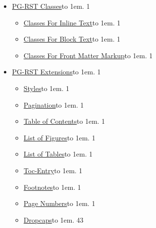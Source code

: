 \documentclass[a5paper]{book}
\begin{document}
\begin{german}
\begin{contents_env}
\begin{itemize}
\begin{itemize}
\item[] \hyperlink{debian}{Debian}\leaders\hbox to 1em{\hss.\hss}\hfill{} 1
\end{itemize}

\item[] \hyperlink{pg-rst-classes}{PG-RST Classes}\leaders\hbox to 1em{\hss.\hss}\hfill{} 1
\begin{itemize}
\item[] \hyperlink{classes-for-inline-text}{Classes For Inline Text}\leaders\hbox to 1em{\hss.\hss}\hfill{} 1

\item[] \hyperlink{classes-for-block-text}{Classes For Block Text}\leaders\hbox to 1em{\hss.\hss}\hfill{} 1

\item[] \hyperlink{classes-for-front-matter-markup}{Classes For Front Matter Markup}\leaders\hbox to 1em{\hss.\hss}\hfill{} 1
\end{itemize}

\item[] \hyperlink{pg-rst-extensions}{PG-RST Extensions}\leaders\hbox to 1em{\hss.\hss}\hfill{} 1
\begin{itemize}
\item[] \hyperlink{styles}{Styles}\leaders\hbox to 1em{\hss.\hss}\hfill{} 1

\item[] \hyperlink{pagination}{Pagination}\leaders\hbox to 1em{\hss.\hss}\hfill{} 1

\item[] \hyperlink{table-of-contents}{Table of Contents}\leaders\hbox to 1em{\hss.\hss}\hfill{} 1

\item[] \hyperlink{list-of-figures}{List of Figures}\leaders\hbox to 1em{\hss.\hss}\hfill{} 1

\item[] \hyperlink{list-of-tables}{List of Tables}\leaders\hbox to 1em{\hss.\hss}\hfill{} 1

\item[] \hyperlink{toc-entry}{Toc-Entry}\leaders\hbox to 1em{\hss.\hss}\hfill{} 1

\item[] \hyperlink{footnotes}{Footnotes}\leaders\hbox to 1em{\hss.\hss}\hfill{} 1

\item[] \hyperlink{page-numbers}{Page Numbers}\leaders\hbox to 1em{\hss.\hss}\hfill{} 1

\item[] \hyperlink{dropcaps}{Dropcaps}\leaders\hbox to 1em{\hss.\hss}\hfill{} 43


\end{itemize}
\end{itemize}
\end{contents_env}
\end{german}
\end{document}
